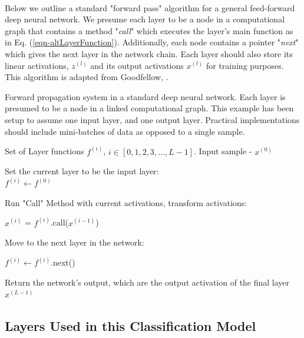 \documentclass[12pt,letterpaper]{article}
\begin{document}
\paragraph*{}Below we outline a standard "forward pass" algorithm for a general feed-forward deep neural network. We presume each layer to be a node in a computational graph that contains a method "\textit{call}" which executes the layer's main function as in Eq. (\ref{eqn-altLayerFunction}). Additionally, each node contains a pointer "\textit{next}" which gives the next layer in the network chain. Each layer should also store its linear activations, $z^{(l)}$ and its output activations $x^{(l)}$ for training purposes. This algorithm is adapted from Goodfellow, \cite{Goodfellow}.

\begin{algorithm}[H]
\caption{Forward propagation system in a standard deep neural network. Each layer is presumed to be a node in a linked computational graph. This example has been setup to assume one input layer, and one output layer. Practical implementations should include mini-batches of data as opposed to a single sample.}
\label{alg-FeedForward}

\begin{algorithmic}
\REQUIRE Set of Layer functions $f^{(i)}$, $i \in [0,1,2,3,...,L-1]$.
\REQUIRE Input sample - $x^{(0)}$

Set the current layer to be the input layer: \\
$f^{(i)} \leftarrow f^{(0)}$
	\item Run "Call" Method with current activations, transform activations:
	\item $x^{(i)}$ = $f^{(i)}$.call($x^{(i-1)}$)
	\item Move to the next layer in the network:
	\item $f^{(i)} \leftarrow f^{(i)}$.next()
\ENDFOR
\item Return the network's output, which are the output activation of the final layer \\
\RETURN $x^{(L-1)}$
\end{algorithmic}
\end{algorithm}


\subsection{Layers Used in this Classification Model}
\label{subsec-Layers}
\end{document}
